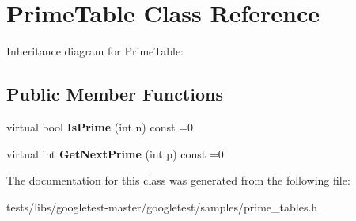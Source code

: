\hypertarget{classPrimeTable}{}\section{Prime\+Table Class Reference}
\label{classPrimeTable}


Inheritance diagram for Prime\+Table\+:
\subsection*{Public Member Functions}
\begin{DoxyCompactItemize}
\item 
\mbox{\label{classPrimeTable_a2ab9243364ded0c51541f641b2df362a}} 
virtual bool {\bfseries Is\+Prime} (int n) const =0
\item 
\mbox{\label{classPrimeTable_ae537c939f56617d8937d57bbbae3ab30}} 
virtual int {\bfseries Get\+Next\+Prime} (int p) const =0
\end{DoxyCompactItemize}


The documentation for this class was generated from the following file\+:\begin{DoxyCompactItemize}
\item 
tests/libs/googletest-\/master/googletest/samples/prime\+\_\+tables.\+h\end{DoxyCompactItemize}
